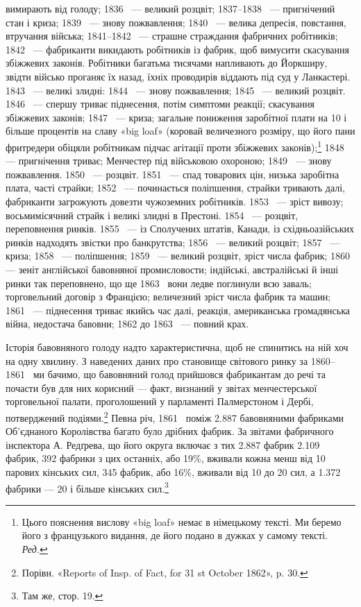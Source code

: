 \parcont{}  %
вимирають від голоду; 1836~ — великий розцвіт; 1837--1838~ —
пригнічений стан і криза; 1839~ — знову пожвавлення; 1840~ —
велика депресія, повстання, втручання війська; 1841--1842~ —
страшне страждання фабричних робітників; 1842~ — фабриканти
викидають робітників із фабрик, щоб вимусити скасування збіжжевих
законів. Робітники багатьма тисячами напливають до
Йоркширу, звідти військо проганяє їх назад, їхніх проводирів
віддають під суд у Ланкастері. 1843~ — великі злидні: 1844~ —
знову пожвавлення; 1845~ — великий розцвіт. 1846~ — спершу
триває піднесення, потім симптоми реакції; скасування збіжжевих
законів; 1847~ — криза; загальне пониження заробітної плати
на 10 і більше процентів на славу «big loaf» (коровай величезного
розміру, що його пани фритредери обіцяли робітникам підчас
агітації проти збіжжевих законів);\footnote*{
Цього пояснення вислову «big loaf» немає в німецькому тексті.
Ми беремо його з французького видання, де його подано в дужках у самому
тексті. \emph{Ред.}
} 1848~ — пригнічення триває; Менчестер під військовою охороною; 1849~ —
знову пожвавлення. 1850~ — розцвіт. 1851~ — спад товарових цін, низька
заробітна плата, часті страйки; 1852~ — починається поліпшення,
страйки тривають далі, фабриканти загрожують довезти чужоземних
робітників. 1853~ — зріст вивозу; восьмимісячний страйк
і великі злидні в Престоні. 1854~ — розцвіт, переповнення ринків.
1855~ — із Сполучених штатів, Канади, із східньоазійських
ринків надходять звістки про банкрутства; 1856~ — великий
розцвіт; 1857~ — криза; 1858~ — поліпшення; 1859~ — великий
розцвіт, зріст числа фабрик; 1860~ — зеніт англійської
бавовняної промисловости; індійські, австралійські й інші ринки
так переповнено, що ще 1863~ вони ледве поглинули всю заваль;
торговельний договір з Францією; величезний зріст числа фабрик
та машин; 1861~ — піднесення триває якийсь час далі, реакція,
американська громадянська війна, недостача бавовни; 1862 до
1863~ — повний крах.

Історія бавовняного голоду надто характеристична, щоб не
спинитись на ній хоч на одну хвилину. З наведених даних про
становище світового ринку за 1860--1861~ ми бачимо, що
бавовняний голод прийшовся фабрикантам до речі та почасти був
для них корисний — факт, визнаний у звітах менчестерської
торговельної палати, проголошений у парламенті Палмерстоном
і Дербі, потверджений подіями.\footnote{
Порівн. «Reports of Insp. of Fact, for 31 st October 1862», p. 30.
} Певна річ, 1861~
поміж \num{2.887} бавовняними фабриками Об’єднаного Королівства
багато було дрібних фабрик. За звітами фабричного інспектора
А. Редґрева, що його округа включає з тих \num{2.887} фабрик \num{2.109} фабрик,
392 фабрики з цих останніх, або 19\%, вживали кожна
менш від 10 парових кінських сил, 345 фабрик, або 16\%, вживали
від 10 до 20 сил, а \num{1.372} фабрики — 20 і більше кінських сил.\footnote{
Там же, стор. 19.
}
\parbreak{}  %
